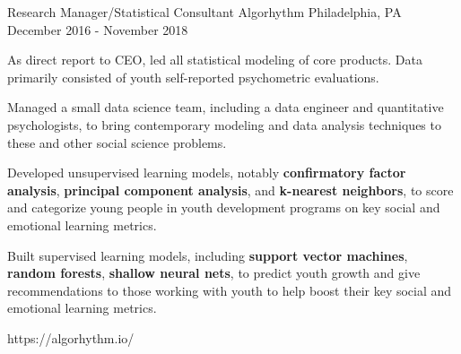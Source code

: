 \begin{cventries}
\cventrylink
{Research Manager/Statistical Consultant}
{Algorhythm}
{Philadelphia, PA}
{December 2016 - November 2018} %
{ %
\begin{cvitems}
\item{As direct report to CEO, led all statistical modeling of core products. Data primarily consisted of youth self-reported psychometric evaluations.}
\item{Managed a small data science team, including a data engineer and quantitative psychologists, to bring contemporary modeling and data analysis techniques to these and other social science problems.}
\item{Developed unsupervised learning models, notably \textbf{confirmatory factor analysis}, \textbf{principal component analysis}, and \textbf{k-nearest neighbors}, to score and categorize young people in youth development programs on key social and emotional learning metrics.}
\item{Built supervised learning models, including \textbf{support vector machines}, \textbf{random forests}, \textbf{shallow neural nets}, to predict youth growth and give recommendations to those working with youth to help boost their key social and emotional learning metrics.}
\end{cvitems}
}
{https://algorhythm.io/}

\end{cventries}

